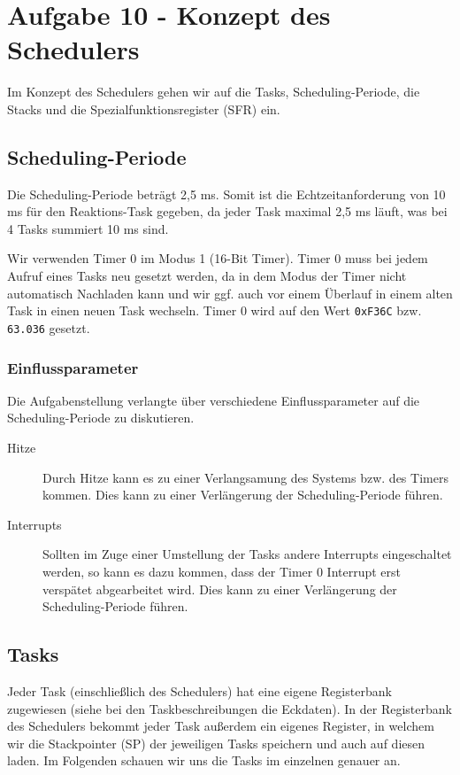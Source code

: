 \chapter{Aufgabe 10 - Konzept des Schedulers}
Im Konzept des Schedulers gehen wir auf die Tasks, Scheduling-Periode, die Stacks und die Spezialfunktionsregister (SFR) ein.

\section{Scheduling-Periode}
\label{subsec:schedulingPeriode}
Die Scheduling-Periode beträgt 2,5 ms.
Somit ist die Echtzeitanforderung von 10 ms für den Reaktions-Task gegeben, da jeder Task maximal 2,5 ms läuft, was bei 4 Tasks summiert 10 ms sind.

Wir verwenden Timer 0 im Modus 1 (16-Bit Timer).
Timer 0 muss bei jedem Aufruf eines Tasks neu gesetzt werden, da in dem Modus der Timer nicht automatisch Nachladen kann und wir ggf. auch vor einem Überlauf in einem alten Task in einen neuen Task wechseln.
Timer 0 wird auf den Wert \verb|0xF36C| bzw. \verb|63.036| gesetzt.

\subsection{Einflussparameter}
Die Aufgabenstellung verlangte über verschiedene Einflussparameter auf die Scheduling-Periode zu diskutieren.
\begin{description}
    \item[Hitze]
    Durch Hitze kann es zu einer Verlangsamung des Systems bzw. des Timers kommen.
    Dies kann zu einer Verlängerung der Scheduling-Periode führen.
    \item[Interrupts]
    Sollten im Zuge einer Umstellung der Tasks andere Interrupts eingeschaltet werden, so kann es dazu kommen, dass der Timer 0 Interrupt erst verspätet abgearbeitet wird.
    Dies kann zu einer Verlängerung der Scheduling-Periode führen.
\end{description}

\section{Tasks}
Jeder Task (einschließlich des Schedulers) hat eine eigene Registerbank zugewiesen (siehe bei den Taskbeschreibungen die Eckdaten).
In der Registerbank des Schedulers bekommt jeder Task außerdem ein eigenes Register, in welchem wir die Stackpointer (SP) der jeweiligen Tasks speichern und auch auf diesen laden.
Im Folgenden schauen wir uns die Tasks im einzelnen genauer an.

